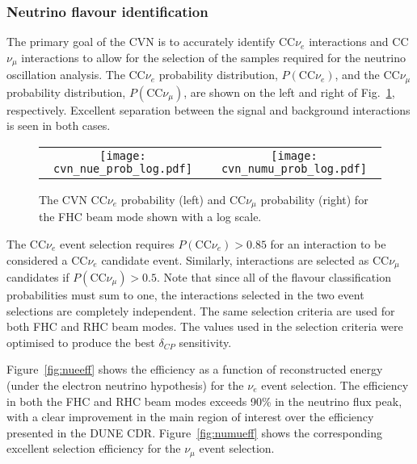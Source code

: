 \subsubsection{Neutrino flavour identification}
The primary goal of the CVN is to accurately identify CC$\nu_e$ interactions and CC$\nu_\mu$ interactions to allow for the selection of the samples required for the neutrino oscillation analysis. The CC$\nu_e$ probability distribution, $P(\textrm{CC}\nu_e)$, and the CC$\nu_\mu$ probability distribution, $P(\textrm{CC}\nu_\mu)$, are shown on the left and right of Fig.~\ref{fig:cvnprob}, respectively. Excellent separation between the signal and background interactions is seen in both cases.

\begin{figure}
    \centering
    \begin{tabular}{cc}
		\texttt{[image: cvn\_nue\_prob\_log.pdf]} &
		\texttt{[image: cvn\_numu\_prob\_log.pdf]} 
	\end{tabular}
	\caption{The CVN CC$\nu_e$ probability (left) and CC$\nu_\mu$ probability (right) for the FHC beam mode shown with a log scale.}
    \label{fig:cvnprob}
\end{figure}

The CC$\nu_e$ event selection requires $P(\textrm{CC}\nu_e) > 0.85$ for an interaction to be considered a CC$\nu_e$ candidate event. Similarly, interactions are selected as CC$\nu_\mu$ candidates if $P(\textrm{CC}\nu_\mu) > 0.5$. Note that since all of the flavour classification probabilities must sum to one, the interactions selected in the two event selections are completely independent. The same selection criteria are used for both FHC and RHC beam modes. The values used in the selection criteria were optimised to produce the best $\delta_{CP}$ sensitivity.

Figure~\ref{fig:nueeff} shows the efficiency as a function of reconstructed energy (under the electron neutrino hypothesis) for the $\nu_e$ event selection. The efficiency in both the FHC and RHC beam modes exceeds 90\% in the neutrino flux peak, with a clear improvement in the main region of interest over the efficiency presented in the DUNE CDR. Figure~\ref{fig:numueff} shows the corresponding excellent selection efficiency for the $\nu_\mu$ event selection.

